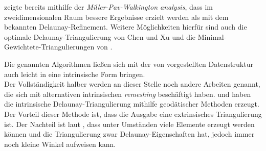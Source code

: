 \citet{rand:2011:Miller-Pav-Walkington} zeigte bereits mithilfe der \textit{Miller-Pav-Walkington analysis}, dass im zweidimensionalen Raum bessere Ergebnisse erzielt werden als mit dem bekannten Delaunay-Refinement.
Weitere Möglichkeiten hierfür sind auch die optimale Delaunay-Triangulierung von Chen und Xu \cite{chen:2004:mesh-odt,chen:2004:optimal-delaunay-triangulation} und die Minimal-Gewichtete-Triangulierungen von \citet{mulzer:2008:minimum}.

Die genannten Algorithmen ließen sich mit der von \citet{Sharp:2019:NIT} vorgestellten Datenstruktur auch leicht in eine intrinsische Form bringen.\\

Der Vollständigkeit halber werden an dieser Stelle noch andere Arbeiten genannt, die sich mit alternativen intrinsischen \textit{remeshing} beschäftigt haben. \citet{liu:2017:geodesic_Voronoi} und \citet{xin:2011:geodesic_delaunay} haben die intrinsische Delaunay-Triangulierung mithilfe  geodätischer Methoden erzeugt. Der Vorteil dieser Methode ist, dass die Ausgabe eine extrinsisches Triangulierung ist. Der Nachteil ist laut \citet{Sharp:2019:NIT}, dass unter Umständen viele Elemente erzeugt werden können und die Triangulierung zwar Delaunay-Eigenschaften hat, jedoch immer noch kleine Winkel aufweisen kann.\\ %